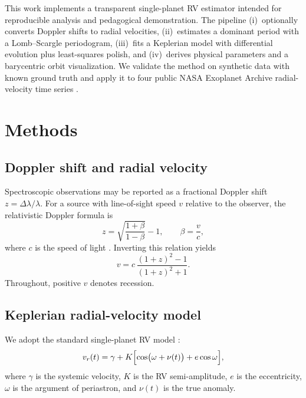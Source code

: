 \documentclass[11pt]{article}
\begin{document}
This work implements a transparent single-planet RV estimator intended for
reproducible analysis and pedagogical demonstration. The pipeline
(i)~optionally converts Doppler shifts to radial velocities,
(ii)~estimates a dominant period with a Lomb--Scargle periodogram,
(iii)~fits a Keplerian model with differential evolution plus least-squares
polish, and
(iv)~derives physical parameters and a barycentric orbit visualization.
We validate the method on synthetic data with known ground truth and apply it
to four public NASA Exoplanet Archive radial-velocity time series
\citep{christiansen2025nea}.

\section{Methods}

\subsection{Doppler shift and radial velocity}

Spectroscopic observations may be reported as a fractional Doppler shift
$z = \Delta\lambda/\lambda$. For a source with line-of-sight speed $v$
relative to the observer, the relativistic Doppler formula is
\begin{equation}
z = \sqrt{\frac{1+\beta}{1-\beta}} - 1,
\qquad
\beta = \frac{v}{c},
\end{equation}
where $c$ is the speed of light \citep{lindegren2003fundamental}. Inverting
this relation yields
\begin{equation}
v = c\,\frac{(1+z)^2 - 1}{(1+z)^2 + 1}.
\end{equation}
Throughout, positive $v$ denotes recession.

\subsection{Keplerian radial-velocity model}

We adopt the standard single-planet RV model
\citep{wright2009efficient,murray2010keplerian}:
\begin{equation}
v_r(t)
=
\gamma
+
K\Bigl[
\cos\bigl(\omega + \nu(t)\bigr)
+
e\cos\omega
\Bigr],
\label{eq:rv}
\end{equation}
where $\gamma$ is the systemic velocity, $K$ is the RV semi-amplitude,
$e$ is the eccentricity, $\omega$ is the argument of periastron, and
$\nu(t)$ is the true anomaly.
\end{document}
